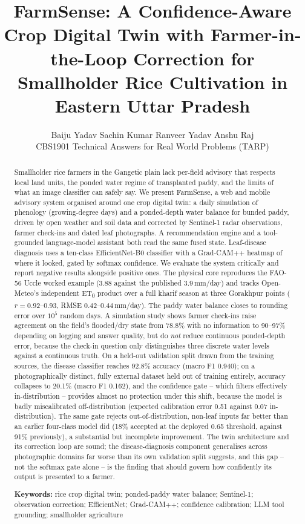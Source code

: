 \documentclass[11pt,a4paper]{article}
\title{\textbf{FarmSense: A Confidence-Aware Crop Digital Twin with Farmer-in-the-Loop Correction for Smallholder Rice Cultivation in Eastern Uttar Pradesh}}
\author{Baiju Yadav \quad Sachin Kumar \quad Ranveer Yadav \quad Anshu Raj\\[2pt]
\small CBS1901 Technical Answers for Real World Problems (TARP)}
\date{}
\begin{document}
\maketitle
\vspace{-1.2em}

\begin{abstract}
\noindent Smallholder rice farmers in the Gangetic plain lack per-field advisory that respects local land units, the ponded water regime of transplanted paddy, and the limits of what an image classifier can safely say. We present FarmSense, a web and mobile advisory system organised around one crop digital twin: a daily simulation of phenology (growing-degree days) and a ponded-depth water balance for bunded paddy, driven by open weather and soil data and corrected by Sentinel-1 radar observations, farmer check-ins and dated leaf photographs. A recommendation engine and a tool-grounded language-model assistant both read the same fused state. Leaf-disease diagnosis uses a ten-class EfficientNet-B0 classifier with a Grad-CAM++ heatmap of where it looked, gated by softmax confidence. We evaluate the system critically and report negative results alongside positive ones. The physical core reproduces the FAO-56 Uccle worked example (3.88 against the published 3.9\,mm/day) and tracks Open-Meteo's independent ET\textsubscript{0} product over a full kharif season at three Gorakhpur points ($r=0.92$--$0.93$, RMSE 0.42--0.44\,mm/day). The paddy water balance closes to rounding error over $10^5$ random days. A simulation study shows farmer check-ins raise agreement on the field's flooded/dry state from 78.8\% with no information to 90--97\% depending on logging and answer quality, but do \emph{not} reduce continuous ponded-depth error, because the check-in question only distinguishes three discrete water levels against a continuous truth. On a held-out validation split drawn from the training sources, the disease classifier reaches 92.8\% accuracy (macro F1 0.940); on a photographically distinct, fully external dataset held out of training entirely, accuracy collapses to 20.1\% (macro F1 0.162), and the confidence gate -- which filters effectively in-distribution -- provides almost no protection under this shift, because the model is badly miscalibrated off-distribution (expected calibration error 0.51 against 0.07 in-distribution). The same gate rejects out-of-distribution, non-leaf inputs far better than an earlier four-class model did (18\% accepted at the deployed 0.65 threshold, against 91\% previously), a substantial but incomplete improvement. The twin architecture and its correction loop are sound; the disease-diagnosis component generalises across photographic domains far worse than its own validation split suggests, and this gap -- not the softmax gate alone -- is the finding that should govern how confidently its output is presented to a farmer.

\vspace{0.4em}
\noindent\textbf{Keywords:} rice crop digital twin; ponded-paddy water balance; Sentinel-1; observation correction; EfficientNet; Grad-CAM++; confidence calibration; LLM tool grounding; smallholder agriculture
\end{abstract}
\end{document}
